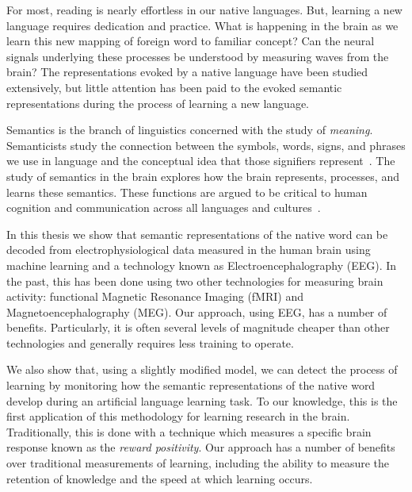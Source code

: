 \label{chapter:introduction}

For most, reading is nearly effortless in our native languages. But, learning a 
new language requires dedication and practice. What is happening in the brain 
as we learn this new mapping of foreign word to familiar concept? Can the 
neural signals underlying these processes be understood by measuring waves from 
the brain? The representations evoked by a native language have been studied 
extensively, but little attention has been paid to the evoked semantic 
representations during the process of learning a new language.
 
Semantics is the branch of linguistics concerned with the study of 
\emph{meaning}. Semanticists study the connection between the symbols, words, 
signs, and phrases we use in language and the conceptual idea that those 
signifiers represent~\cite{kreidler2002introducing}. The study of semantics in 
the brain explores how the brain represents, processes, and learns these 
semantics. These functions are argued to be critical to human cognition and 
communication across all languages and cultures~\cite{croft2004cognitive}.

In this thesis we show that semantic representations of the native word can be 
decoded from electrophysiological data measured in the human brain using 
machine learning and a technology known as Electroencephalography (EEG). In the 
past, this has been done using two other technologies for measuring brain 
activity: functional Magnetic Resonance Imaging (fMRI) and 
Magnetoencephalography (MEG).  Our approach, using EEG, has a number of 
benefits. Particularly, it is often several levels of magnitude cheaper than 
other technologies and generally requires less training to operate.

We also show that, using a slightly modified model, we can detect the process 
of learning by monitoring how the semantic representations of the native word 
develop during an artificial language learning task. To our knowledge, this is 
the first application of this methodology for learning research in the brain.  
Traditionally, this is done with a technique which measures a specific brain 
response known as the \emph{reward positivity}. Our approach has a number of 
benefits over traditional measurements of learning, including the ability to 
measure the retention of knowledge and the speed at which learning occurs.


